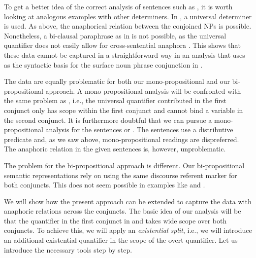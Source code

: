 \documentclass[output=paper]{langsci/langscibook}
\begin{document}
To get a better idea of the correct analysis of sentences such as , it is worth looking at analogous examples with other determiners.
In , a universal determiner is used. 
As above, the anaphorical relation between the conjoined NPs is possible. 
Nonetheless, a bi-clausal paraphrase as in  is not possible, as the universal quantifier does not easily allow for cross-sentential anaphora \citep{Kamp:81}.
This shows that these data cannot be captured in a straightforward way in an analysis that uses  as the syntactic basis for the surface noun phrase conjunction in .


\ea \label{ex-every-ana}
\begin{xlist}
\label{ex-french-actress}\label{ex-every-anaA}
\label{ex-every-ana-french}
\label{ex-every-anaB}
\end{xlist}
\z 

The data are equally problematic for both our mono-propositional and our bi-propositional approach. 
A mono-propositional analysis will be confronted with the same problem as , i.e., the universal quantifier contributed in the first conjunct only has scope within the first conjunct and cannot bind a variable in the second conjunct. 
It is furthermore doubtful that we can pursue a mono-propositional analysis for the sentences  or . The sentences use a distributive predicate and, as we saw above, mono-propositional readings are dispreferred. The anaphoric relation in the given sentences is, however, unproblematic.

\begin{sloppypar}
  The problem for the bi-propositional approach is different.  Our
  bi-prop\-o\-si\-tional semantic representations rely on using the same
  discourse referent marker for both conjuncts. This does not seem
  possible in examples like  and
  .
\end{sloppypar}


We will show how the present approach can be extended to capture the data with anaphoric relations across the conjuncts. 
The basic idea of our analysis will be that the quantifier in the first conjunct in  and  takes wide scope over both conjuncts. 
To achieve this, we will apply an \emph{existential split}, i.e., we will introduce an additional existential quantifier in the scope of the overt quantifier. 
Let us introduce the necessary tools step by step.
\end{document}
